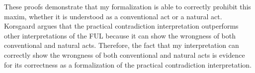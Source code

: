 \begin{isabellebody}
\begin{isamarkuptext}
These proofs demonstrate that my formalization is able to correctly prohibit this maxim, whether 
it is understood as a conventional act or a natural act. 
Korsgaard argues that the practical contradiction interpretation outperforms other interpretations
of the FUL because it can show the wrongness of both conventional and natural acts. Therefore, the 
fact that my interpretation can correctly show the wrongness of both conventional and natural acts
is evidence for its correctness as a formalization of the practical contradiction interpretation.%
\end{isamarkuptext}\isamarkuptrue%
%
\isadelimproof
%
\endisadelimproof
%
\isatagproof
%
\endisatagproof
{\isafoldproof}%
%
\isadelimproof
%
\endisadelimproof
%
\isadelimdocument
%
\endisadelimdocument
%
\isatagdocument
%
\endisatagdocument
{\isafolddocument}%
%
\isadelimdocument
%
\endisadelimdocument
%
\isadelimtheory
%
\endisadelimtheory
%
\isatagtheory
%
\endisatagtheory
{\isafoldtheory}%
%
\isadelimtheory
%
\endisadelimtheory
%
\end{isabellebody}%
\endinput
